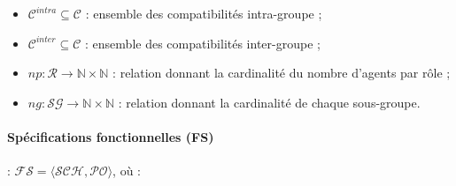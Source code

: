 \begin{itemize}
\begin{itemize}
        \item $\mathcal{C}^{intra} \subseteq \mathcal{C}$ : ensemble des compatibilités intra-groupe ;
        \item $\mathcal{C}^{inter} \subseteq \mathcal{C}$ : ensemble des compatibilités inter-groupe ;
        \item $np: \mathcal{R} \rightarrow \mathbb{N} \times \mathbb{N}$ : relation donnant la cardinalité du nombre d'agents par rôle ;
        \item $ng: \mathcal{SG} \rightarrow \mathbb{N} \times \mathbb{N}$ : relation donnant la cardinalité de chaque sous-groupe.
    \end{itemize}
\end{itemize}

\paragraph{\textbf{Spécifications fonctionnelles (FS)}} : $\mathcal{FS} = \langle \mathcal{SCH}, \mathcal{PO} \rangle$, où :


